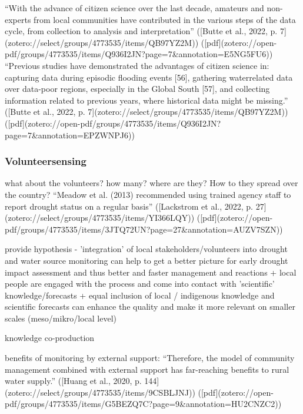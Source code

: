 {“With the advance of citizen science over the last decade, amateurs and non-experts from local communities have contributed in the various steps of the data cycle, from collection to analysis and interpretation” ([Butte et al., 2022, p. 7](zotero://select/groups/4773535/items/QB97YZ2M)) ([pdf](zotero://open-pdf/groups/4773535/items/Q936I2JN?page=7&annotation=E5NG5FU6))
“Previous studies have demonstrated the advantages of citizen science in: capturing data during episodic flooding events [56], gathering waterrelated data over data-poor regions, especially in the Global South [57], and collecting information related to previous years, where historical data might be missing.” ([Butte et al., 2022, p. 7](zotero://select/groups/4773535/items/QB97YZ2M)) ([pdf](zotero://open-pdf/groups/4773535/items/Q936I2JN?page=7&annotation=EPZWNPJ6))



\subsubsection{Volunteersensing}
what about the volunteers? how many? where are they? How to they spread over the country?
“Meadow et al. (2013) recommended using trained agency staff to report drought status on a regular basis” ([Lackstrom et al., 2022, p. 27](zotero://select/groups/4773535/items/YI366LQY)) ([pdf](zotero://open-pdf/groups/4773535/items/3JTQ72UN?page=27\&annotation=AUZV7SZN))

provide hypothesis - 'integration' of local stakeholders/volunteers into drought and water source monitoring can help to get a better picture for early drought impact assessment and thus better and faster management and reactions
+ local people are engaged with the process and come into contact with 'scientific' knowledge/forecasts 
+ equal inclusion of local / indigenous knowledge and scientific forecasts can enhance the quality and make it more relevant on smaller scales (meso/mikro/local level)

knowledge co-production
\autocite{dasInteractiveInformationCrowdsourcing2016}

benefits of monitoring by external support:
“Therefore, the model of community management combined with external support has far-reaching benefits to rural water supply.” ([Huang et al., 2020, p. 144](zotero://select/groups/4773535/items/9CSBLJNJ)) ([pdf](zotero://open-pdf/groups/4773535/items/G5BEZQ7C?page=9&annotation=HU2CNZC2))

}
